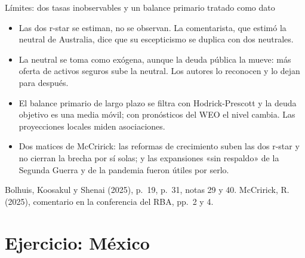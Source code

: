\documentclass[aspectratio=169,11pt]{beamer}
\newcommand{\fuente}[1]{\par\vfill{\small\color{cGris}#1\par}}
\newcommand{\BKS}{Bolhuis, Koosakul y Shenai (2025)}
\begin{document}
\begin{frame}{Límites: dos tasas inobservables y un balance primario tratado como dato}
  \begin{itemize}
    \item<1-> Las dos r-star se estiman, no se observan. La comentarista, que estimó la neutral de Australia, dice que su escepticismo se duplica con dos neutrales.
    \item<2-> La neutral se toma como exógena, aunque la deuda pública la mueve: más oferta de activos seguros sube la neutral. Los autores lo reconocen y lo dejan para después.
    \item<3-> El balance primario de largo plazo se filtra con Hodrick-Prescott y la deuda objetivo es una media móvil; con pronósticos del WEO el nivel cambia. Las proyecciones locales miden asociaciones.
    \item<4-> Dos matices de McCririck: las reformas de crecimiento suben las dos r-star y no cierran la brecha por sí solas; y las expansiones «sin respaldo» de la Segunda Guerra y de la pandemia fueron útiles por serlo.
  \end{itemize}
  \fuente{\BKS, p.~19, p.~31, notas 29 y 40. McCririck, R. (2025), comentario en la conferencia del RBA, pp.~2 y 4.}
\end{frame}

\section{Ejercicio: México}
\end{document}
